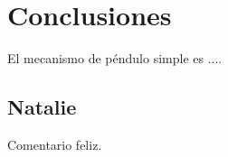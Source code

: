 \section{Conclusiones}
El mecanismo de péndulo simple es ....


\subsection{Natalie}

Comentario feliz.
